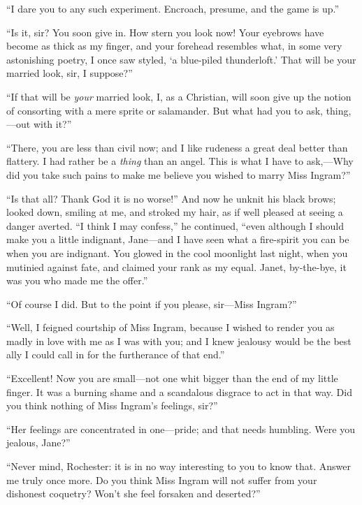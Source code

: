 \enquote{I dare you to any such experiment.  Encroach, presume, and the
game is up.}

\enquote{Is it, sir?  You soon give in.  How stern you look now!  Your
eyebrows have become as thick as my finger, and your forehead resembles
what, in some very astonishing poetry, I once saw styled, \enquote{a
blue-piled thunderloft.}  That will be your married look, sir, I
suppose?}

\enquote{If that will be \emph{your} married look, I, as a Christian, will soon
give up the notion of consorting with a mere sprite or salamander.  But
what had you to ask, thing,---out with it?}

\enquote{There, you are less than civil now; and I like rudeness a great deal
better than flattery.  I had rather be a \emph{thing} than an angel. 
This is what I have to ask,---Why did you take such pains to make me
believe you wished to marry Miss Ingram?}

\enquote{Is that all?  Thank God it is no worse!}  And now he unknit his
black brows; looked down, smiling at me, and stroked my hair, as if well
pleased at seeing a danger averted.  \enquote{I think I may confess,} he
continued, \enquote{even although I should make you a little indignant,
Jane---and I have seen what a fire-spirit you can be when you are
indignant.  You glowed in the cool moonlight last night, when you
mutinied against fate, and claimed your rank as my equal.  Janet,
by-the-bye, it was you who made me the offer.}

\enquote{Of course I did.  But to the point if you please, sir---Miss
Ingram?}

\enquote{Well, I feigned courtship of Miss Ingram, because I wished to
render you as madly in love with me as I was with you; and I knew
jealousy would be the best ally I could call in for the furtherance of
that end.}

\enquote{Excellent!  Now you are small---not one whit bigger than the
end of my little finger.  It was a burning shame and a scandalous
disgrace to act in that way.  Did you think nothing of Miss Ingram's
feelings, sir?}

\enquote{Her feelings are concentrated in one---pride; and that needs
humbling.  Were you jealous, Jane?}

\enquote{Never mind, \Mr{} Rochester: it is in no way interesting to you
to know that.  Answer me truly once more.  Do you think Miss Ingram will
not suffer from your dishonest coquetry?  Won't she feel forsaken and
deserted?}

